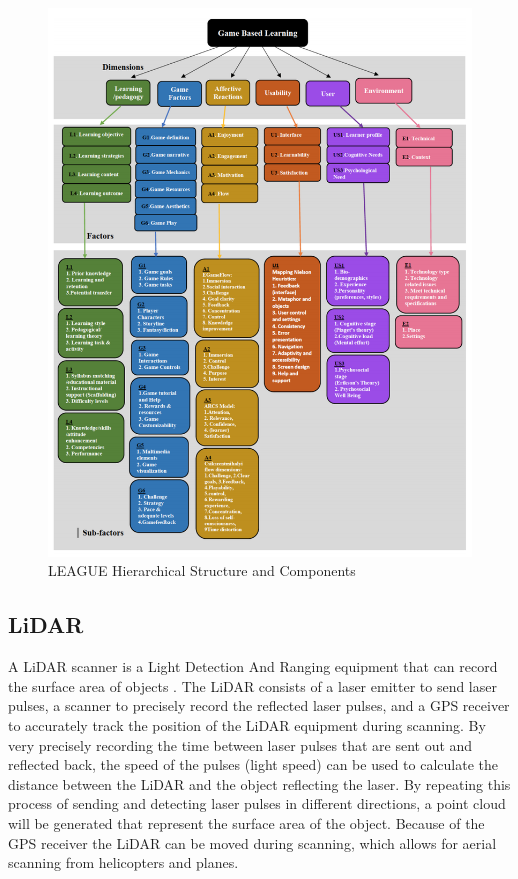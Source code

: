         \FloatBarrier
        \begin{figure}[htbp]
            \centering
            \includegraphics[width=\linewidth]{figures/league.PNG}
            \caption{LEAGUE Hierarchical Structure and Components}
            \label{fig:league}
        \end{figure}
        \FloatBarrier
        
    \subsection{LiDAR}
        A LiDAR scanner is a Light Detection And Ranging equipment that can record the surface area of objects \cite{lidar}. The LiDAR consists of a laser emitter to send laser pulses, a scanner to precisely record the reflected laser pulses, and a GPS receiver to accurately track the position of the LiDAR equipment during scanning. By very precisely recording the time between laser pulses that are sent out and reflected back, the speed of the pulses (light speed) can be used to calculate the distance between the LiDAR and the object reflecting the laser. By repeating this process of sending and detecting laser pulses in different directions, a point cloud will be generated that represent the surface area of the object. Because of the GPS receiver the LiDAR can be moved during scanning, which allows for aerial scanning from helicopters and planes.
        
